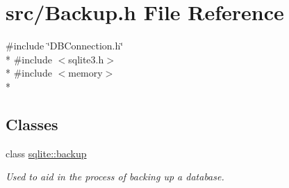\hypertarget{a00018}{\section{src/\-Backup.h File Reference}
\label{a00018}
}
{\ttfamily \#include \char`\"{}D\-B\-Connection.\-h\char`\"{}}\\*
{\ttfamily \#include $<$sqlite3.\-h$>$}\\*
{\ttfamily \#include $<$memory$>$}\\*
\subsection*{Classes}
\begin{DoxyCompactItemize}
\item 
class \hyperlink{a00001}{sqlite\-::backup}
\begin{DoxyCompactList}\small\item\em Used to aid in the process of backing up a database. \end{DoxyCompactList}\end{DoxyCompactItemize}
